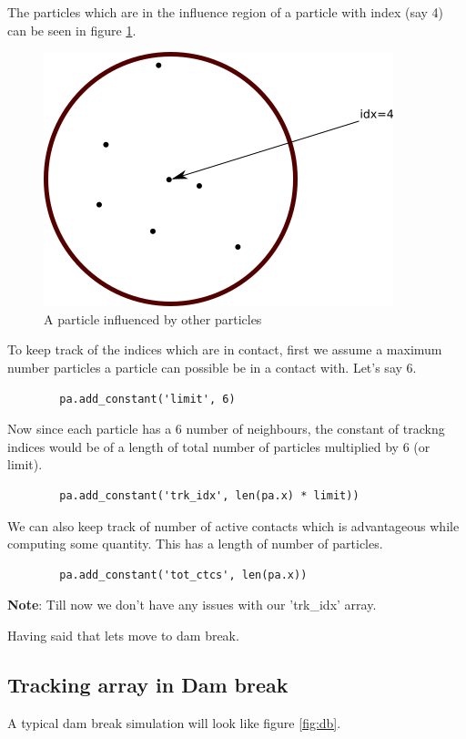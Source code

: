 \documentclass[11pt]{article}
\begin{document}
The particles which are in the influence region of a particle with index
(say 4) can be seen in figure \ref{fig:par_trk_idxs}.

\begin{figure}[H]
\centering
\includegraphics[scale=1]{dem_pysph_implementation_figures/ed_zoom.png}
\caption{A particle influenced by other particles\label{fig:par_trk_idxs}}
\end{figure}

To keep track of the indices which are in contact, first we assume a maximum
number particles a particle can possible be in a contact with. Let's say 6.

\begin{verbatim}
    	pa.add_constant('limit', 6)
\end{verbatim}

Now since each particle has a 6 number of neighbours, the constant of trackng
indices would be of a length of total number of particles multiplied by 6 (or
limit).

\begin{verbatim}
    	pa.add_constant('trk_idx', len(pa.x) * limit))
\end{verbatim}

We can also keep track of number of active contacts which is advantageous
while computing some quantity. This has a length of number of particles.

\begin{verbatim}
    	pa.add_constant('tot_ctcs', len(pa.x))
\end{verbatim}

\textbf{Note}: Till now we don't have any issues with our 'trk\_idx' array.

Having said that lets move to dam break.

\subsection{Tracking array in Dam break}
\label{sec:org5d274da}
A typical dam break simulation will look like figure \ref{fig:db}.
\end{document}
